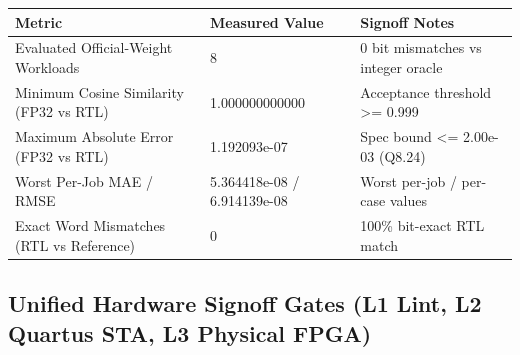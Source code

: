 \documentclass[11pt,a4paper]{article}
\begin{document}
{\small\renewcommand{\arraystretch}{1.18}\begin{longtable}{@{}L{0.38\textwidth}|L{0.26\textwidth}|L{0.28\textwidth}@{}}\toprule

\textbf{Metric} & \textbf{Measured Value} & \textbf{Signoff Notes}\\\midrule\endhead

Evaluated Official-Weight Workloads & 8 & 0 bit mismatches vs integer oracle\\[2pt]\hline

Minimum Cosine Similarity (\allowbreak{}FP32 vs RTL)\allowbreak{} & 1.00000000\allowbreak{}0000 & Acceptance threshold >=\allowbreak{} 0.999\\[2pt]\hline

Maximum Absolute Error (\allowbreak{}FP32 vs RTL)\allowbreak{} & 1.192093e-07 & Spec bound <=\allowbreak{} 2.00e-03 (\allowbreak{}Q8.24)\allowbreak{}\\[2pt]\hline

Worst Per-Job MAE /\allowbreak{} RMSE & 5.364418e-08 /\allowbreak{} 6.914139e-08 & Worst per-job /\allowbreak{} per-case values\\[2pt]\hline

Exact Word Mismatches (\allowbreak{}RTL vs Reference)\allowbreak{} & 0 & 100\% bit-exact RTL match\\[2pt]\hline

\bottomrule\end{longtable}}

\subsection{Unified Hardware Signoff Gates (L1 Lint, L2 Quartus STA, L3 Physical FPGA)}
\end{document}
